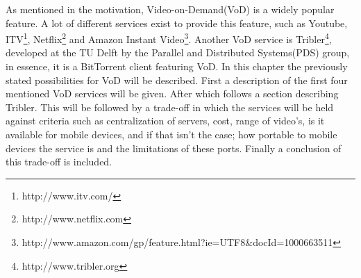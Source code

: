 As mentioned in the motivation, Video-on-Demand(VoD) is a widely popular feature. A lot of different services exist to provide this feature, such as Youtube, ITV\footnote{http://www.itv.com/}, Netflix\footnote{http://www.netflix.com} and Amazon Instant Video\footnote{http://www.amazon.com/gp/feature.html?ie=UTF8\&docId=1000663511}. Another VoD service is Tribler\footnote{http://www.tribler.org}, developed at the TU Delft by the Parallel and Distributed Systems(PDS) group, in essence, it is a BitTorrent client featuring VoD. In this chapter the previously stated possibilities for VoD will be described. First a description of the first four mentioned VoD services will be given. After which follows a section describing Tribler. This will be followed by a trade-off in which the services will be held against criteria such as centralization of servers, cost, range of video's, is it available for mobile devices, and if that isn't the case; how portable to mobile devices the service is and the limitations of these ports. Finally a conclusion of this trade-off is included.